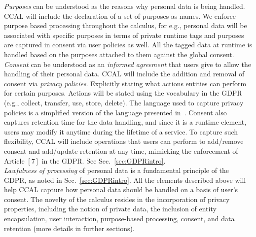 \emph{Purposes} can be understood as the reasons why personal data is being handled. CCAL will include the declaration of a set of purposes as names. We enforce purpose based processing throughout the calculus, for e.g., personal data will be associated with specific purposes in terms of private runtime tags and purposes are captured in consent via user policies as well. 
All the tagged data at runtime is handled based on the purposes attached to them against the global consent.\\
\emph{Consent} can be understood as an \emph{informed agreement} that users give to allow the handling of their personal data. CCAL will include the addition and removal of consent via \emph{privacy policies}. Explicitly stating what actions entities can perform for certain purposes. Actions will be stated using the vocabulary in the GDPR (e.g., collect, transfer, use, store, delete). The language used to capture privacy policies is a simplified version of the
language presented in~\cite{BaramashetruTOG22}. 
Consent also captures retention time for the data handling, %
and since it is a runtime element, %
users may modify it anytime during the lifetime of a service. To capture such flexibility, CCAL will include operations that users can perform to add/remove consent and add/update retention at any time, mimicking the enforcement of Article $[7]$ in the GDPR. See Sec.~\ref{sec:GDPRintro}. \\
\emph{Lawfulness of processing} of personal data is a fundamental principle of the GDPR, as noted in Sec.~\ref{sec:GDPRintro}. All the elements described above will help CCAL capture how personal data should be handled on a basis of user's consent. 
The novelty of the calculus resides in the incorporation of privacy properties, 
including %
the notion of private data, the inclusion of entity encapsulation, user interaction, purpose-based processing, consent, and data retention (more details in further sections).

